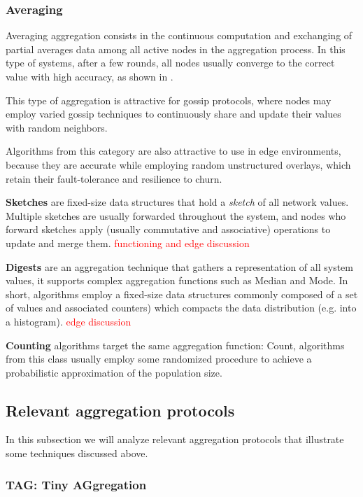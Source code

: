 \subsubsection{Averaging}

Averaging aggregation consists in the continuous computation and exchanging of partial averages data among all active nodes in the aggregation process. In this type of systems, after a few rounds, all nodes usually converge to the correct value with high accuracy, as shown in \cite{gossip_aggregation}.

This type of aggregation is attractive for gossip protocols, where nodes may employ varied gossip techniques to continuously share and update their values with random neighbors.

Algorithms from this category are also attractive to use in edge environments, because they are accurate while employing random unstructured overlays, which retain their fault-tolerance and resilience to churn.

\textbf{Sketches} are fixed-size data structures that hold a \textit{sketch} of all network values. Multiple sketches are usually forwarded throughout the system, and nodes who forward sketches apply (usually commutative and associative) operations to update and merge them. \textcolor{red}{functioning and edge discussion}


\textbf{Digests} are an aggregation technique that gathers a representation of all system values, it supports complex aggregation functions such as Median and Mode. In short, algorithms employ a fixed-size data structures commonly composed of a set of values and associated counters) which compacts the data distribution (e.g. into a histogram). \textcolor{red}{edge discussion}

\textbf{Counting} algorithms target the same aggregation function: Count, algorithms from this class usually employ some randomized procedure to achieve a probabilistic approximation of the population size.

\subsection{Relevant aggregation protocols}

In this subsection we will analyze relevant aggregation protocols that illustrate some techniques discussed above.

\subsubsection{TAG: Tiny AGgregation}


